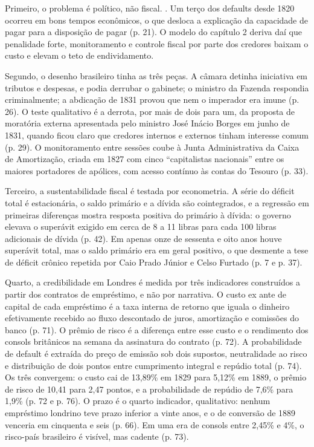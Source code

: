Primeiro, o problema é político, não fiscal. . Um terço dos defaults desde 1820 ocorreu em bons tempos econômicos, o que desloca a explicação da capacidade de pagar para a disposição de pagar (p. 21). O modelo do capítulo 2 deriva daí que penalidade forte, monitoramento e controle fiscal por parte dos credores baixam o custo e elevam o teto de endividamento.

Segundo, o desenho brasileiro tinha as três peças. A câmara detinha iniciativa em tributos e despesas, e podia derrubar o gabinete; o ministro da Fazenda respondia criminalmente; a abdicação de 1831 provou que nem o imperador era imune (p. 26). O teste qualitativo é a derrota, por mais de dois para um, da proposta de moratória externa apresentada pelo ministro José Inácio Borges em junho de 1831, quando ficou claro que credores internos e externos tinham interesse comum (p. 29). O monitoramento entre sessões coube à Junta Administrativa da Caixa de Amortização, criada em 1827 com cinco ``capitalistas nacionais'' entre os maiores portadores de apólices, com acesso contínuo às contas do Tesouro (p. 33).

Terceiro, a sustentabilidade fiscal é testada por econometria. A série do déficit total é estacionária, o saldo primário e a dívida são cointegrados, e a regressão em primeiras diferenças mostra resposta positiva do primário à dívida: o governo elevava o superávit exigido em cerca de 8 a 11 libras para cada 100 libras adicionais de dívida (p. 42). Em apenas onze de sessenta e oito anos houve superávit total, mas o saldo primário era em geral positivo, o que desmente a tese de déficit crônico repetida por Caio Prado Júnior e Celso Furtado (p. 7 e p. 37).

Quarto, a credibilidade em Londres é medida por três indicadores construídos a partir dos contratos de empréstimo, e não por narrativa. O custo ex ante de capital de cada empréstimo é a taxa interna de retorno que iguala o dinheiro efetivamente recebido ao fluxo descontado de juros, amortização e comissões do banco (p. 71). O prêmio de risco é a diferença entre esse custo e o rendimento dos consols britânicos na semana da assinatura do contrato (p. 72). A probabilidade de default é extraída do preço de emissão sob dois supostos, neutralidade ao risco e distribuição de dois pontos entre cumprimento integral e repúdio total (p. 74). Os três convergem: o custo cai de 13,89\% em 1829 para 5,12\% em 1889, o prêmio de risco de 10,41 para 2,47 pontos, e a probabilidade de repúdio de 7,6\% para 1,9\% (p. 72 e p. 76). O prazo é o quarto indicador, qualitativo: nenhum empréstimo londrino teve prazo inferior a vinte anos, e o de conversão de 1889 venceria em cinquenta e seis (p. 66). Em uma era de consols entre 2,45\% e 4\%, o risco-país brasileiro é visível, mas cadente (p. 73).


